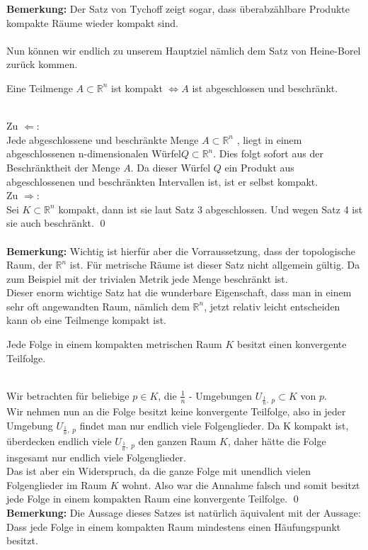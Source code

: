 	{\bf Bemerkung:} Der Satz von Tychoff zeigt sogar, dass überabzählbare Produkte kompakte Räume wieder kompakt sind. \\
	\\
	Nun können wir endlich zu unserem Hauptziel nämlich dem Satz von Heine-Borel zurück kommen.
	\begin{Satz}
		Eine Teilmenge  \( A \subset \mathbb{R}^n \) ist kompakt \(\Leftrightarrow A \) ist abgeschlossen und beschränkt.
	\end{Satz}
	 \\
		Zu \(\Leftarrow \): \\
		Jede abgeschlossene und beschränkte Menge \(A \subset\mathbb{R}^n \) , liegt in einem abgeschlossenen n-dimensionalen Würfel\( Q \subset \mathbb{R}^n \). Dies folgt sofort aus der 
		Beschränktheit der Menge \(A\). Da dieser Würfel \( Q \) ein Produkt aus abgeschlossenen und beschränkten Intervallen ist, ist er selbst kompakt.
		\\
		Zu \(\Rightarrow \): \\
		Sei \( K \subset \mathbb{R}^n \) kompakt, dann ist sie laut Satz 3 abgeschlossen. Und wegen Satz 4 ist sie auch beschränkt.
	\qed \\
	\\
	{\bf Bemerkung:} Wichtig ist hierfür aber die Vorraussetzung, dass der topologische Raum, der \(\mathbb{R}^n \) ist. Für metrische Räume ist dieser Satz nicht allgemein gültig. 
	Da zum Beispiel mit der trivialen Metrik jede Menge beschränkt ist.\\
	Dieser enorm wichtige Satz hat die wunderbare Eigenschaft, dass man in einem sehr oft angewandten Raum, nämlich dem \(\mathbb{R}^n \), 
	jetzt relativ leicht entscheiden kann ob eine Teilmenge kompakt ist. 
	\begin{Satz}
		Jede Folge in einem kompakten metrischen Raum \(K\) besitzt einen konvergente Teilfolge.
	\end{Satz}
	\\
		Wir betrachten für beliebige \( p \in K \), die \( \frac{1}{n} \) - Umgebungen \( U_{\frac{1}{n},\;p} \subset K \) von \(p \). \\
		Wir nehmen nun an die Folge besitzt keine konvergente Teilfolge, also in jeder Umgebung  \( U_{\frac{1}{n},\;p} \) findet man nur endlich viele Folgenglieder. 
		Da K kompakt ist, überdecken endlich viele  \( U_{\frac{1}{n},\;p} \) den ganzen Raum \( K \), daher hätte die Folge insgesamt nur endlich viele Folgenglieder.\\
		Das ist aber ein Widerspruch, da die ganze Folge mit unendlich vielen Folgenglieder im Raum \(K \) wohnt. Also war die Annahme falsch und somit besitzt jede Folge in einem kompakten
		Raum eine konvergente Teilfolge.
	\qed\\
	{\bf Bemerkung:} Die Aussage dieses Satzes ist natürlich äquivalent mit der Aussage: Dass jede Folge in einem kompakten Raum mindestens einen Häufungspunkt besitzt. 
		
	

